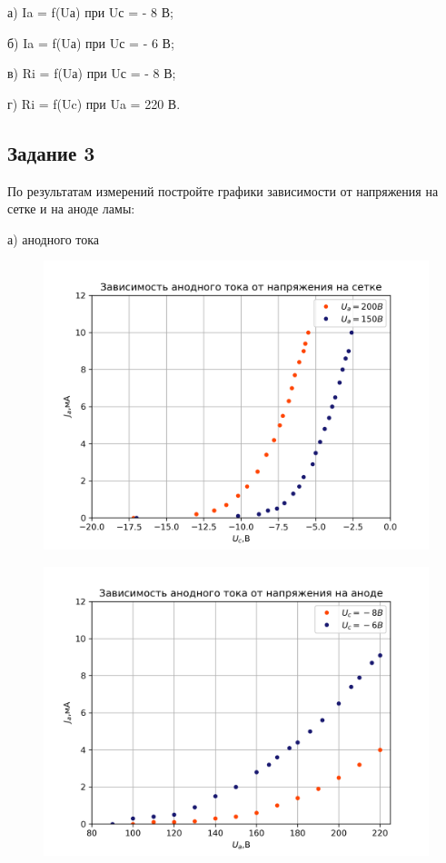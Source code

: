 а) Ia = f(Uа) при Uс = - 8 В;

б) Ia = f(Uа) при Uс = - 6 В;

в) Ri = f(Uа) при Uс = - 8 В;

г) Ri = f(Uc) при Ua = 220 В.

\subsection{Задание 3}
По результатам измерений постройте графики зависимости от напряжения на сетке и на 
аноде ламы:

а) анодного тока
\begin{figure}[h!]
	\centering
	\includegraphics[width=0.7\linewidth]{scripts/z01.png}
	\caption{}
	\label{fig:10}
\end{figure}

\begin{figure}[h!]
	\centering
	\includegraphics[width=0.7\linewidth]{scripts/z02.png}
	\caption{}
	\label{fig:10}
\end{figure}

